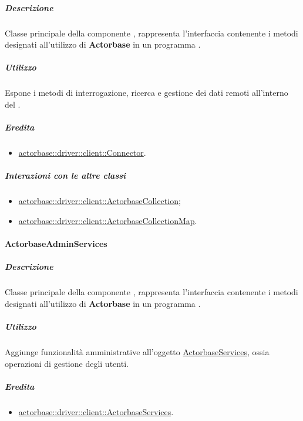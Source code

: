\documentclass{scalatekids-article}
\begin{document}
\subparagraph{Descrizione}

Classe principale della componente , rappresenta l'interfaccia
contenente i metodi designati all'utilizzo di \textbf{Actorbase} in un programma
.

\subparagraph{Utilizzo}

Espone i metodi di interrogazione, ricerca e gestione dei dati
remoti all'interno del .

\subparagraph{Eredita}

\begin{itemize}
\item \hyperref[sec:actorbase::driver::client::Connector]{actorbase::driver::client::Connector}.
\end{itemize}

\subparagraph{Interazioni con le altre classi}

\begin{itemize}
\item \hyperref[sec:actorbase::driver::client::ActorbaseCollection]{actorbase::driver::client::ActorbaseCollection};
\item \hyperref[sec:actorbase::driver::client::ActorbaseCollection]{actorbase::driver::client::ActorbaseCollectionMap}.
\end{itemize}

\paragraph{ActorbaseAdminServices}
\label{sec:actorbase::driver::ActorbaseAdminServices}

\subparagraph{Descrizione}

Classe principale della componente , rappresenta l'interfaccia
contenente i metodi designati all'utilizzo di \textbf{Actorbase} in un programma
.

\subparagraph{Utilizzo}

Aggiunge funzionalità amministrative all'oggetto
\hyperref[sec:actorbase::driver::ActorbaseServices]{ActorbaseServices}, ossia
operazioni di gestione degli utenti.

\subparagraph{Eredita}

\begin{itemize}
\item \hyperref[sec:actorbase::driver::client::ActorbaseServices]{actorbase::driver::client::ActorbaseServices}.
\end{itemize}
\end{document}
